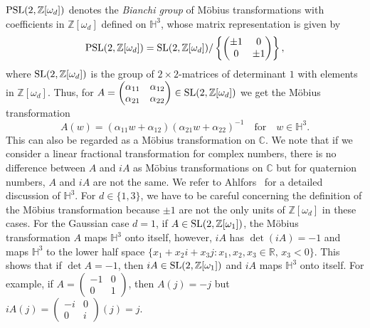 \documentclass[graybox]{svmult}
\begin{document}
${\rm PSL}(2, \mathbb{Z}[\omega_d])$ denotes the {\em Bianchi group} of M\"obius transformations with coefficients in $\mathbb{Z}[\omega_d]$ defined on  $\mathbb H^{3}$, whose matrix representation is given by 
\[
{\rm PSL}(2, \mathbb{Z}[\omega_d]) = {\rm SL}(2,  \mathbb{Z}[\omega_d])/ 
\left\{ \begin{pmatrix} \pm 1 & 0 \\ 0 & \pm 1 \end{pmatrix}\right\}, 
\]
where ${\rm SL}(2, \mathbb{Z}[\omega_d])$ is the group of $2\times 2$-matrices of determinant $1$ with elements in $ \mathbb{Z}[\omega_d]$.
Thus, for $A= \begin{pmatrix} \alpha_{1 1} & \alpha_{1 2} \\ \alpha_{2 1}& \alpha_{2 2} \end{pmatrix}  \in 
{\rm SL}(2, \mathbb Z[\omega_{d}])$ we get the M\"obius transformation 
\[
A(w) = (\alpha_{1 1}w + \alpha_{1 2})(\alpha_{2 1} w + \alpha_{2 2})^{-1} \quad \mbox{for} \quad w \in \mathbb H^{3}.
\] 
This can also be regarded as a M\"obius transformation on $\mathbb{C}$. We note that if we consider a linear fractional transformation for complex numbers, there is no difference between $A$ and $iA$ as M\"obius transformations on $\mathbb{C}$ but for quaternion numbers, $A$ and $iA$ are not the same.  We refer to Ahlfors~\cite{A} for a detailed discussion of $\mathbb{H}^3$. For $d \in\{1,3\}$, we have to be careful concerning the definition of the M\"obius transformation because $\pm1$ are not the only units of $\mathbb{Z}[\omega_d]$ in these cases.  
For the Gaussian case $d=1$, if $A \in {\rm SL}(2, \mathbb{Z}[\omega_1])$, the M\"obius transformation $A$ maps $\mathbb H^{3}$ onto itself, however, $iA$ has $\det (iA) = -1$ and maps $\mathbb H^{3}$ to the lower half space $\{ x_{1} + x_{2} i + x_{3} j : x_{1}, x_{2}, x_{3} \in \mathbb R,\, x_{3} <0 \}$. This shows that if $\det A = -1$,  then $iA \in {\rm SL}(2, \mathbb{Z}[\omega_1])$ and $iA$ maps $\mathbb H^{3}$ onto itself.  For example, if $A = \begin{pmatrix} -1 & 0 \\ 0 &1 \end{pmatrix}$, then  $A(j) = -j$ but $iA(j)= \begin{pmatrix} -i & 0 \\ 0 &i \end{pmatrix}(j) = j$. 
\end{document}
